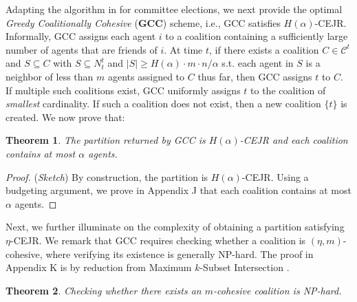 \documentclass[letterpaper]{article}
\newtheorem{theorem}{Theorem}
\begin{document}
Adapting the algorithm in \cite[Section 5.2]{do2022online} for committee elections, we next provide the optimal \textit{Greedy Coalitionally Cohesive} (\textbf{GCC}) scheme, i.e., GCC satisfies $H(\alpha)$-CEJR. Informally, GCC assigns each agent $i$ to a coalition containing a sufficiently large number of agents that are friends of $i$. At time $t$, if there exists a coalition $C \in \mathcal{C}^t$ and $S \subseteq C$ with $S \subseteq N_t^t$ and $|S| \geq H(\alpha) \cdot m \cdot n/\alpha$ s.t. each agent in $S$ is a neighbor of less than $m$ agents assigned to $C$ thus far, then GCC assigns $t$ to $C$. If multiple such coalitions exist, GCC uniformly assigns $t$ to the coalition of \textit{smallest} cardinality. If such a coalition does not exist, then a new coalition $\{t\}$ is created. We now prove that: %
\begin{theorem}
\label{thm:gcc}
The partition returned by GCC is $H(\alpha)$-CEJR and each coalition contains at most $\alpha$ agents.
\end{theorem}
\begin{proof}
(\textit{Sketch})
By construction, the partition is $H(\alpha)$-CEJR. Using a budgeting argument, we prove in Appendix J that each coalition contains at most $\alpha$ agents. %
\end{proof}

Next, we further illuminate on the complexity of obtaining a partition satisfying $\eta$-CEJR. We remark that GCC requires checking whether a coalition is $(\eta, m)$-cohesive, where verifying its existence is generally NP-hard. The proof in Appendix K is by reduction from Maximum $k$-Subset Intersection \cite{xavier2012note}.
\begin{theorem}
\label{thm:cohesive np hard}
Checking whether there exists an $m$-cohesive coalition is NP-hard.
\end{theorem}
\end{document}
